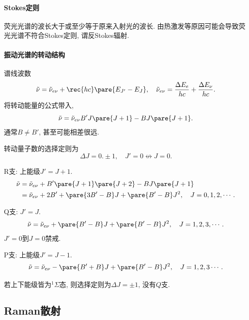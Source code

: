 \documentclass[hidelinks]{ctexart}
\begin{document}
\paragraph{Stokes定则} %
\label{par:stokes定则}

荧光光谱的波长大于或至少等于原来入射光的波长. 由热激发等原因可能会导致荧光光谱不符合Stokes定则, 谓反Stokes辐射.


\paragraph{振动光谱的转动结构} %
\label{par:振动光谱的转动结构}

谱线波数
\[ \tilde{\nu} = \tilde{\nu}_{e\nu} + \rec{hc}\pare{E_{J'} - E_J},\quad \tilde{\nu}_{e\nu} = \frac{\Delta E_e}{hc} + \frac{\Delta E_\nu}{hc}. \]
将转动能量的公式带入,
\[ \tilde{\nu} = \tilde{\nu}_{e\nu} B'J\pare{J+1} - BJ\pare{J+1}. \]
通常$B\neq B'$, 甚至可能相差很远.
\par
转动量子数的选择定则为
\[ \Delta J = 0.\pm 1,\quad J'=0 \not\leftrightarrow J=0. \]
\begin{cenum}
    \item R支: 上能级$J' = J+1$.
    \begin{align*}
        \tilde{\nu} &= \tilde{\nu}_{e\nu} + B'\pare{J+1}\pare{J+2} - BJ\pare{J+1} \\
        &= \tilde{\nu}_{e\nu} + 2B' + \pare{3B' - B}J + \pare{B'-B}J^2,\quad J = 0,1,2,\cdots.
    \end{align*}
    \item Q支: $J' = J$.
    \[ \tilde{\nu} = \tilde{\nu}_{e\nu} + \pare{B'-B}J + \pare{B' - B}J^2,\quad J = 1,2,3,\cdots. \]
    $J'=0$到$J=0$禁戒.
    \item P支: 上能级$J' = J-1$.
    \[ \tilde{\nu} = \tilde{\nu}_{e\nu} - \pare{B' + B}J + \pare{B' - B}J^2,\quad J = 1,2,3\cdots. \]
\end{cenum}
\begin{pitfall}
    若上下能级皆为$^1\Sigma$态, 则选择定则为$\Delta J = \pm 1$, 没有$Q$支.
\end{pitfall}




\subsection{Raman散射} %
\label{sub:raman散射}
\end{document}
